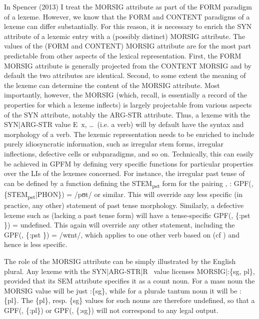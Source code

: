 \documentclass[output=paper,
modfonts
]{LSP/langsci}
\begin{document}
In Spencer (2013) I treat the MORSIG attribute as part of the FORM paradigm of a lexeme. However, we know that the FORM and CONTENT paradigms of a lexeme can differ substantially. For this reason, it is necessary to enrich the SYN attribute of a lexemic entry with a (possibly distinct) MORSIG attribute. 
The values of the (FORM and CONTENT) MORSIG attribute are for the most part predictable from other aspects of the lexical representation. First, the FORM MORSIG attribute is generally projected from the CONTENT MORSIG and by default the two attributes are identical. Second, to some extent the meaning of the lexeme can determine the content of the MORSIG attribute. Most importantly, however, the MORSIG (which, recall, is essentially a record of the properties for which a lexeme inflects) is largely projectable from various aspects of the SYN attribute, notably the ARG-STR attribute. Thus, a lexeme with the SYN|ARG-STR value \lab E\lab\ x, \ldots\rab\rab\ (i.e. a verb) will by default have the syntax and morphology of a verb. The lexemic representation needs to be enriched to include purely idiosyncratic information, such as irregular stem forms, irregular inflections, defective cells or subparadigms, and so on. Technically, this can easily be achieved in GPFM by defining very specific functions for particular properties over the LIs of the lexemes concerned. For instance, the irregular past tense of  can be defined by a function  defining the  STEM\textsubscript{pst} form for the pairing \lab{}, \rab: GPF(\lab{},  \{STEM\textsubscript{pst}|PHON\}\rab) = /pʊt/ or similar. This will override any less specific (in practice, any other) statement of past tense morphology. Similarly, a defective lexeme such as  (lacking a past tense form) will have a tense-specific GPF(\lab{}, \{:pst \}\rab) = \textsf{undefined}. This again will override any other statement, including the GPF(\lab{}, \{:pst \}\rab) = /wɛnt/, which applies to one other verb based on  (cf ) and hence is less specific.

\begin{sloppypar}The role of the MORSIG attribute can be simply illustrated by the English plural. Any lexeme with the SYN|ARG-STR|\lab R \rab\ value licenses MORSIG|:\{sg, pl\}, provided that its SEM attribute specifies it as a count noun. For a mass noun the MORSIG value will be just :\{sg\}, while for a plurale tantum noun it will be :\{pl\}. The \{pl\}, resp. \{sg\} values for such nouns are therefore undefined, so that a GPF(\lab{}, \{:pl\}\rab) or %
GPF(\lab{}, \{:sg\}\rab) will not correspond to any legal output.\end{sloppypar}
\end{document}
